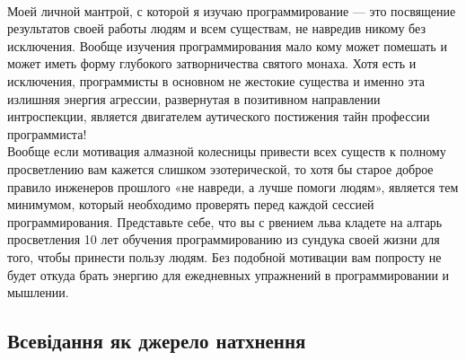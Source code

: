 \\
Моей личной мантрой, с которой я изучаю программирование — это посвящение результатов своей работы людям и всем существам, не навредив никому без исключения. Вообще изучения программирования мало кому может помешать и может иметь форму глубокого затворничества святого монаха. Хотя есть и исключения, программисты в основном не жестокие существа и именно эта излишняя энергия агрессии, развернутая в позитивном направлении интроспекции, является двигателем аутического постижения тайн профессии программиста!
\\
Вообще если мотивация алмазной колесницы привести всех существ к полному просветлению вам кажется слишком эзотерической, то хотя бы старое доброе правило инженеров прошлого «не навреди, а лучше помоги людям», является тем минимумом, который необходимо проверять перед каждой сессией программирования. Представьте себе, что вы с рвением льва кладете на алтарь просветления 10 лет обучения программированию из сундука своей жизни для того, чтобы принести пользу людям. Без подобной мотивации вам попросту не будет откуда брать энергию для ежедневных упражнений в программировании и мышлении.

\subsection{Всевідання як джерело натхнення}

